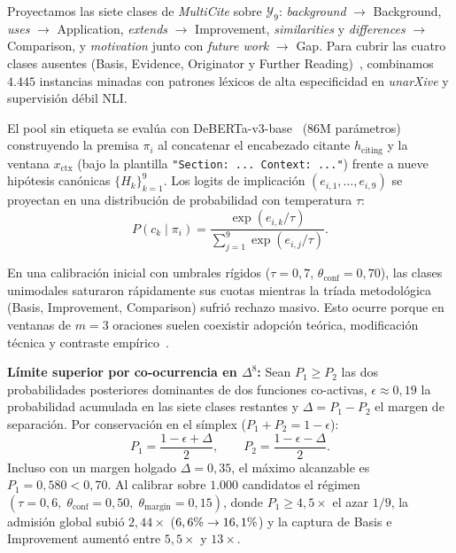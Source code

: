 \documentclass[conference]{IEEEtran}
\newcommand{\pct}{\mbox{\symbol{37}}}
\begin{document}
Proyectamos las siete clases de \textit{MultiCite} sobre $\mathcal{Y}_9$: \textit{background} $\to$ Background, \textit{uses} $\to$ Application, \textit{extends} $\to$ Improvement, \textit{similarities} y \textit{differences} $\to$ Comparison, y \textit{motivation} junto con \textit{future work} $\to$ Gap. Para cubrir las cuatro clases ausentes (Basis, Evidence, Originator y Further Reading)~\cite{lyu2021classification}, combinamos $4.445$ instancias minadas con patrones léxicos de alta especificidad en \textit{unarXive} y supervisión débil NLI.

El pool sin etiqueta se evalúa con DeBERTa-v3-base~\cite{he2023debertav3} (86M parámetros) construyendo la premisa $\pi_i$ al concatenar el encabezado citante $h_{\text{citing}}$ y la ventana $x_{\text{ctx}}$ (bajo la plantilla \texttt{"Section: ...\ Context: ..."}) frente a nueve hipótesis canónicas $\{H_k\}_{k=1}^9$. Los logits de implicación $(e_{i,1}, \dots, e_{i,9})$ se proyectan en una distribución de probabilidad con temperatura $\tau$:
\begin{equation*}
P(c_k \mid \pi_i) = \frac{\exp(e_{i,k} / \tau)}{\sum_{j=1}^{9} \exp(e_{i,j} / \tau)}.
\end{equation*}

En una calibración inicial con umbrales rígidos ($\tau = 0,7$, $\theta_{\text{conf}} = 0,70$), las clases unimodales saturaron rápidamente sus cuotas mientras la tríada metodológica (Basis, Improvement, Comparison) sufrió rechazo masivo. Esto ocurre porque en ventanas de $m=3$ oraciones suelen coexistir adopción teórica, modificación técnica y contraste empírico~\cite{jurgens2018measuring,pride2020authoritative}.

\textbf{Límite superior por co-ocurrencia en $\Delta^8$:} Sean $P_1 \ge P_2$ las dos probabilidades posteriores dominantes de dos funciones co-activas, $\epsilon \approx 0,19$ la probabilidad acumulada en las siete clases restantes y $\Delta = P_1 - P_2$ el margen de separación. Por conservación en el símplex ($P_1 + P_2 = 1 - \epsilon$):
\begin{equation}
\label{eq:prop_colocalizacion}
P_1 = \frac{1 - \epsilon + \Delta}{2}, \qquad P_2 = \frac{1 - \epsilon - \Delta}{2}.
\end{equation}
Incluso con un margen holgado $\Delta = 0,35$, el máximo alcanzable es $P_1 = 0,580 < 0,70$. Al calibrar sobre $1.000$ candidatos el régimen $(\tau = 0,6,\; \theta_{\text{conf}} = 0,50,\; \theta_{\text{margin}} = 0,15)$, donde $P_1 \ge 4,5\times$ el azar $1/9$, la admisión global subió $2,44\times$ ($6,6\pct{} \to 16,1\pct{}$) y la captura de Basis e Improvement aumentó entre $5,5\times$ y $13\times$.
\end{document}
